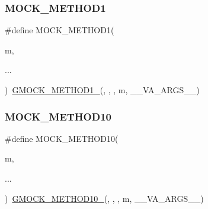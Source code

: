 \mbox{\label{_obj__test_2lib_2googletest-release-1_88_81_2googlemock_2include_2gmock_2gmock-generated-function-mockers_8h_ac49d366be035ee87b73264a29059cdc7}} 
\subsubsection{\texorpdfstring{MOCK\_METHOD1}{MOCK\_METHOD1}}
{\footnotesize\ttfamily \#define M\+O\+C\+K\+\_\+\+M\+E\+T\+H\+O\+D1(\begin{DoxyParamCaption}\item[{}]{m,  }\item[{}]{... }\end{DoxyParamCaption})~\mbox{\hyperlink{_obj__test_2lib_2googletest-release-1_88_81_2googlemock_2include_2gmock_2gmock-generated-function-mockers_8h_a1bc0012d62440dda77208dabdf4925c9}{G\+M\+O\+C\+K\+\_\+\+M\+E\+T\+H\+O\+D1\+\_\+}}(, , , m, \+\_\+\+\_\+\+V\+A\+\_\+\+A\+R\+G\+S\+\_\+\+\_\+)}

\mbox{\label{_obj__test_2lib_2googletest-release-1_88_81_2googlemock_2include_2gmock_2gmock-generated-function-mockers_8h_a01760fdd295f5a92264eed6a9ff1dbf8}} 
\subsubsection{\texorpdfstring{MOCK\_METHOD10}{MOCK\_METHOD10}}
{\footnotesize\ttfamily \#define M\+O\+C\+K\+\_\+\+M\+E\+T\+H\+O\+D10(\begin{DoxyParamCaption}\item[{}]{m,  }\item[{}]{... }\end{DoxyParamCaption})~\mbox{\hyperlink{_obj__test_2lib_2googletest-release-1_88_81_2googlemock_2include_2gmock_2gmock-generated-function-mockers_8h_a81a48223a8771de36ef92ac6d56f6e81}{G\+M\+O\+C\+K\+\_\+\+M\+E\+T\+H\+O\+D10\+\_\+}}(, , , m, \+\_\+\+\_\+\+V\+A\+\_\+\+A\+R\+G\+S\+\_\+\+\_\+)}

